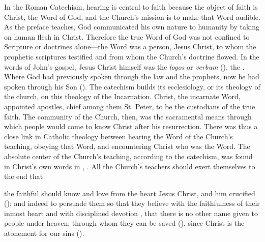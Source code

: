 In the Roman Catechism, hearing is central to faith because the object of faith
is Christ, the Word of God, and the Church's mission is to make that Word
audible.
As the preface teaches, God communicated his own nature to humanity by taking on
human flesh in Christ.
Therefore the true Word of God was not confined to Scripture or doctrines
alone---the Word was a person, Jesus Christ, to whom the prophetic scriptures
testified and from whom the Church's doctrine flowed.%
    \Autocite
    [9: .]
    {Catholic:Catechismus1614}
In the words of John's gospel, Jesus Christ himself was the \emph{logos} or
\emph{verbum} (), the .
Where God had previously spoken through the law and the prophets, now he had
spoken through his Son ().
The catechism builds its ecclesiology, or its theology of the church, on this
theology of the Incarnation.
Christ, the incarnate Word, appointed apostles, chief among them St. Peter, to
be the custodians of the true faith.
The community of the Church, then, was the sacramental means through which
people would come to know Christ after his resurrection.
There was thus a close link in Catholic theology between hearing the Word of the
Church's teaching, obeying that Word, and encountering Christ who was the Word.
The absolute center of the Church's teaching, according to the catechism, was
found in Christ's own words in , .%
    \Autocite
    [6: .]
    {Catholic:Catechismus1614}
All the Church's teachers should exert themselves to the end that
\begin{quoting}
    the faithful should know and love from the heart Jesus Christ, and him
    crucified (); and indeed to persuade them so that they
    believe with the faithfulness  of their inmost heart and
    with disciplined devotion , that there is no other name
    given to people under heaven, through whom they can be saved
    (), since Christ is the atonement for our sins
    ().%
        \Autocite
        [6 (the scriptural citations are in marginal notes): .]
        {Catholic:Catechismus1614}
\end{quoting}
